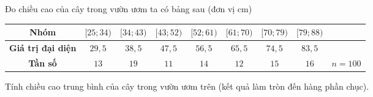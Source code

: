 \begin{bt}%
Đo chiều cao của cây trong vườn ươm ta có bảng sau (đơn vị cm)
\begin{center}
\begin{tabular}{|c|c|c|c|c|c|c|c|c|}
\hline
\textbf{Nhóm} & $[25;34)$ & $[34;43)$ & $[43;52)$ & $[52;61)$ & $[61;70)$ & $[70;79)$ & $[79;88)$ & \\
\hline
\textbf{Giá trị đại diện} & $29{,}5$ & $38{,}5$ & $47{,}5$ & $56{,}5$ & $65{,}5$ & $74{,}5$ & $83{,}5$ & \\
\hline
\textbf{Tần số} & $13$ & $19$ & $11$ & $14$ & $12$ & $15$ & $16$ & $n=100$\\
\hline
\end{tabular}
\end{center}
Tính chiều cao trung bình của cây trong vườn ươm trên (kết quả làm tròn đến hàng phần chục).
\end{bt}

